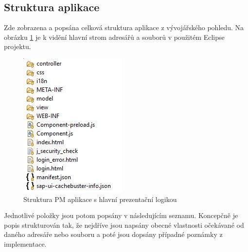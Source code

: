 \documentclass[thesis=M,czech]{FITthesis}[2012/06/26]
\begin{document}
\subsection{Struktura aplikace}
\label{ssec:struckuta_pm_aplikace}
Zde zobrazena a popsána celková struktura aplikace z vývojářského pohledu. Na obrázku \ref{img:pmfiori_app_struct} je k vidění hlavní strom adresářů a souborů v použitém Eclipse projektu. 

\begin{figure}[H]
	\centering
	\includegraphics[]{images/fiori_app_struct}
	\caption{Struktura PM aplikace s hlavní prezentační logikou}
	\label{img:pmfiori_app_struct}
\end{figure}

Jednotlivé položky jsou potom popsány v následujícím seznamu. Koncepčně je popis strukturován tak, že nejdříve jsou napsány obecné vlastnosti očekávané od daného adresáře nebo souboru a poté jsou dopsány případné poznámky z implementace.
\end{document}

